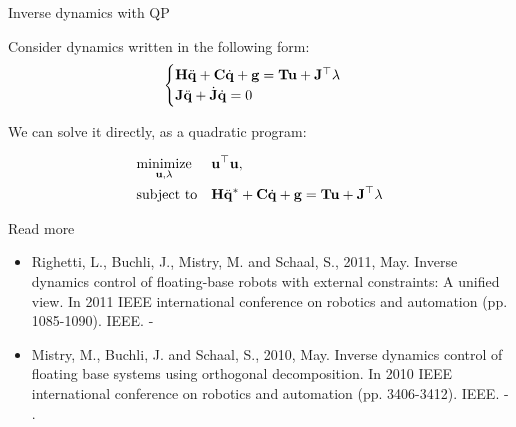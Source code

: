 \documentclass{beamer}
\begin{document}
\begin{frame}{Inverse dynamics with QP}
	\begin{flushleft}
		
		Consider dynamics written in the following form:
		\begin{align}
			\begin{cases}
				\mathbf{H} \ddot{\mathbf{q}} + \mathbf{C} \dot{\mathbf{q}} + \mathbf{g} = \mathbf{T}\mathbf{u} + \mathbf{J}^\top \lambda
				\\
				\mathbf{J} \ddot{\mathbf{q}} + \dot{\mathbf{J}} \dot{\mathbf{q}}= 0
			\end{cases}
		\end{align}		
	
		We can solve it directly, as a quadratic program:
		
		\begin{equation}
			\begin{aligned}
				& \underset{\mathbf{u}, \lambda}{\text{minimize}}
				& & \mathbf{u}^\top \mathbf{u}, \\
				& \text{subject to}
				& & 
				\mathbf{H} \ddot{\mathbf{q}}^* + \mathbf{C} \dot{\mathbf{q}} + \mathbf{g} = \mathbf{T}\mathbf{u} + \mathbf{J}^\top \lambda
			\end{aligned}
		\end{equation}
		
		
	\end{flushleft}
\end{frame}


\begin{frame}{Read more}
	
	\begin{itemize}
		
		\item Righetti, L., Buchli, J., Mistry, M. and Schaal, S., 2011, May. Inverse dynamics control of floating-base robots with external constraints: A unified view. In 2011 IEEE international conference on robotics and automation (pp. 1085-1090). IEEE. - 
		
		\item Mistry, M., Buchli, J. and Schaal, S., 2010, May. Inverse dynamics control of floating base systems using orthogonal decomposition. In 2010 IEEE international conference on robotics and automation (pp. 3406-3412). IEEE. - .
	\end{itemize}
	
\end{frame}



\myqrframe
\end{document}
